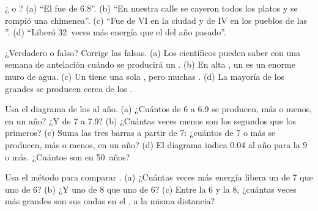 \begin{exercise}[$\star$]\label{exo:g7:earthquakes:3}
¿ o ? (a) ``El  fue de 6.8''. (b) ``En nuestra
calle se cayeron todos los platos y se rompió una chimenea''. (c) ``Fue de
VI en la ciudad y de IV en los pueblos de las ''. (d) ``Liberó
32~veces más energía que el del año pasado''.
\end{exercise}

\begin{exercise}[$\star$]\label{exo:g7:earthquakes:4}
¿Verdadero o falso? Corrige las falsas. (a) Los científicos pueden saber
con una semana de antelación cuándo se producirá un . (b) En alta
, un  es un enorme muro de agua. (c) Un  tiene una sola
, pero muchas . (d) La mayoría de los grandes
 se producen cerca de los .
\end{exercise}

\begin{exercise}[$\star\star$]\label{exo:g7:earthquakes:5}
Usa el diagrama de los  al año. (a) ¿Cuántos  de
 6 a 6.9 se producen, más o menos, en un año? ¿Y de  7 a
7.9? (b) ¿Cuántas veces menos son los segundos que los primeros? (c) Suma
las tres barras a partir de 7: ¿cuántos  de  7 o más se
producen, más o menos, en un año? (d) El diagrama indica 0.04 al año para
la  9 o más. ¿Cuántos son en 50~años?
\end{exercise}

\begin{exercise}[$\star\star$]\label{exo:g7:earthquakes:6}
Usa el método para comparar . (a) ¿Cuántas veces más energía
libera un  de  7 que uno de  6? (b) ¿Y uno de
 8 que uno de  6? (c) Entre la  6 y la 8, ¿cuántas
veces más grandes son sus ondas en el , a la misma distancia?
\end{exercise}

